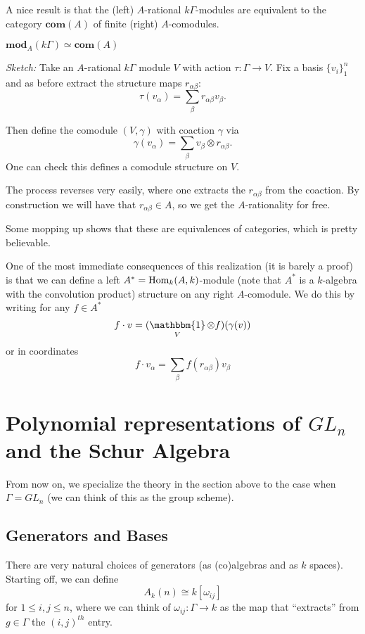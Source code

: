 \documentclass[12pt]{article}
\DeclareMathOperator{\1}{\mathbbm{1}}
\begin{document}
A nice result is that the (left) $A$-rational $k\Gamma$-modules are equivalent to the category $\mathbf{com}(A)$ of finite (right) $A$-comodules.
\begin{prop}\label{prop-modcomod}
	$\mathbf{mod}_A(k\Gamma)\simeq \mathbf{com}(A)$
\end{prop}
\begin{prf}
	\textit{Sketch:} Take an $A$-rational $k\Gamma$ module $V$ with action $\tau:\Gamma\to V$. Fix a basis $\{v_i\}_1^n$
	and as before extract the structure maps $r_{\alpha\beta}$:
	\[\tau(v_\alpha)=\sum_\beta r_{\alpha\beta} v_\beta.\]
	
	Then define the comodule $(V,\gamma)$ with coaction $\gamma$ via 
	\[\gamma(v_\alpha)=\sum_\beta v_\beta\otimes r_{\alpha\beta}.\]
	One can check this defines a comodule structure on $V$. 

	The process reverses very easily, where one extracts the $r_{\alpha\beta}$ from the coaction.
	By construction we will have that $r_{\alpha\beta}\in A$, so we get the $A$-rationality for free.

	Some mopping up shows that these are equivalences of categories, which is pretty believable. 
\end{prf}	
\begin{rmk}
	One of the most immediate consequences of this realization (it is barely a proof) is that we can define a left $A^\ast=\operatorname{Hom}_k(A,k)$-module (note that $A^\ast$ is a $k$-algebra with the convolution product)
	structure on any right $A$-comodule. We do this by writing for any $f\in A^\ast$
	\[f\cdot v=(\1_V\otimes f)(\gamma(v))\]
	or in coordinates 
	\[f\cdot v_\alpha=\sum_\beta f(r_{\alpha\beta})v_\beta\]
\end{rmk}

\section{Polynomial representations of \texorpdfstring{$GL_n$}{GLn} and the Schur Algebra}
From now on, we specialize the theory in the section above to the case when $\Gamma=GL_n$ (we can think of this as the group scheme). 

\subsection{Generators and Bases}
There are very natural choices of generators (as (co)algebras and as $k$ spaces). Starting off, we can define
\[A_k(n)\cong k[\omega_{ij}]\]
for $1\le i,j\le n$, where we can think of $\omega_{ij}:\Gamma\to k$ as the map that ``extracts'' from $g\in\Gamma$ the $(i,j)^{th}$ entry.
\end{document}
